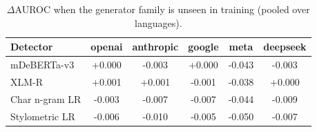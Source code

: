 \begin{table}[t]
\centering
\small
\caption{$\Delta$AUROC when the generator family is unseen in training (pooled over languages).}
\label{tab:lofo}
\begin{tabular}{lccccc}
\toprule
Detector & openai & anthropic & google & meta & deepseek \\
\midrule
mDeBERTa-v3 & +0.000 & -0.003 & +0.000 & -0.043 & -0.003 \\
XLM-R & +0.001 & +0.001 & -0.001 & -0.038 & +0.000 \\
Char n-gram LR & -0.003 & -0.007 & -0.007 & -0.044 & -0.009 \\
Stylometric LR & -0.006 & -0.010 & -0.005 & -0.050 & -0.007 \\
\bottomrule
\end{tabular}
\end{table}